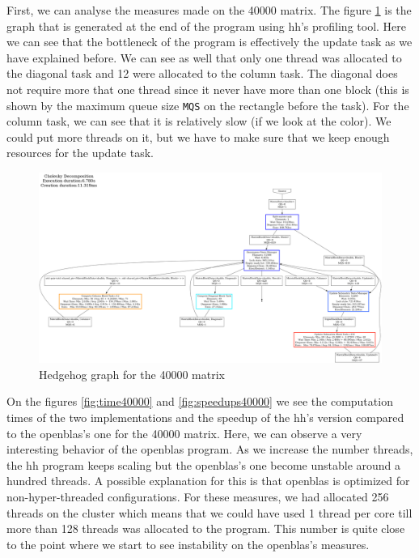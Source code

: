First, we can analyse the measures made on the 40000 matrix. The figure
\ref{fig:40000graph} is the graph that is generated at the end of the program
using \gls{hh}'s profiling tool. Here we can see that the bottleneck of the
program is effectively the update task as we have explained before. We can see
as well that only one thread was allocated to the diagonal task and 12 were
allocated to the column task. The diagonal does not require more that one thread
since it never have more than one block (this is shown by the maximum queue size
\texttt{MQS} on the rectangle before the task). For the column task, we can see
that it is relatively slow (if we look at the color). We could put more threads
on it, but we have to make sure that we keep enough resources for the update
task.

\begin{figure}[!ht]
  \begin{center}
    \includegraphics[scale=0.15]{img/40000.png}
    \caption{Hedgehog graph for the 40000 matrix}
    \label{fig:40000graph}
  \end{center}
\end{figure}

On the figures \ref{fig:time40000} and \ref{fig:speedups40000} we see the
computation times of the two implementations and the speedup of the \gls{hh}'s
version compared to the openblas's one for the 40000 matrix. Here, we can
observe a very interesting behavior of the openblas program. As we increase the
number threads, the \gls{hh} program keeps scaling but the openblas's one become
unstable around a hundred threads. A possible explanation for this is that
openblas is optimized for non-hyper-threaded configurations. For these measures,
we had allocated 256 threads on the cluster which means that we could have used
1 thread per core till more than 128 threads was allocated to the program. This
number is quite close to the point where we start to see instability on the
openblas's measures.

